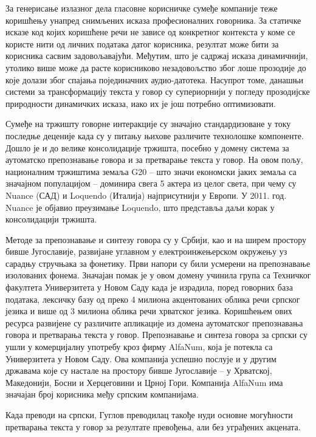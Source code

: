 \begin{multicols}{2}

За генерисање излазног дела гласовне корисничке сумеђе компаније теже коришћењу унапред снимљених исказа професионалних говорника. За статичке исказе код којих коришћене речи не зависе од конкретног контекста у коме се користе нити од личних података датог корисника, резултат може бити за корисника сасвим задовољавајући. Међутим, што је садржај исказа динамичнији, утолико више може да расте корисниково незадовољство због лоше прозодије до које долази  због спајања појединачних аудио-датотека. Насупрот томе, данашњи системи за трансформацију текста у говор су супериорнији у погледу прозодијске природности динамичких исказа, иако их је још потребно оптимизовати. 

Сумеђе на тржишту говорне интеракције су значајно стандардизоване у току последње деценије када су у питању њихове различите технолошке компоненте. Дошло је и до велике консолидације тржишта, посебно у домену система за аутоматско препознавање говора и за претварање текста у говор. На овом пољу, националним тржиштима земаља G20 -- што значи економски јаких земаља са значајном популацијом -- доминира свега 5 актера из целог света, при чему су Nuance  (САД) и Loquendo (Италија) најприсутнији у Европи. У 2011. год. Nuance  је објавио преузимање Loquendo, што представља даљи корак у консолидацији тржишта.

Методе за препознавање и синтезу говора су у Србији, као и на ширем простору бивше Југославије, развијане углавном у електроинжењерском окружењу уз сарадњу стручњака за фонетику. Први напори су били усмерени на препознавање изолованих фонема. Значајан помак је у овом домену учинила група са Техничког факултета Универзитета у Новом Саду када је израдила, поред говорних база података, лексичку базу од преко 4 милиона акцентованих облика речи српског језика и више од 3 милиона облика речи хрватског језика. Коришћењем ових ресурса развијене су различите апликације из домена аутоматског препознавања говора и претварања текста у говор. Препознавање и синтеза говора за српски су ушли у комерцијалну употребу кроз фирму AlfaNum, која је потекла са Универзитета у Новом Саду. Ова компанија успешно послује и у другим државама које су настале на простору бивше Југославије – у Хрватској, Македонији, Босни и Херцеговини и Црној Гори. Компанија AlfaNum има значајан број корисника међу српским компанијама. 

Када преводи на српски, Гуглов преводилац такође нуди основне могућности претварања текста у говор за резултате превођења, али без уграђених акцената. 


\end{multicols}
